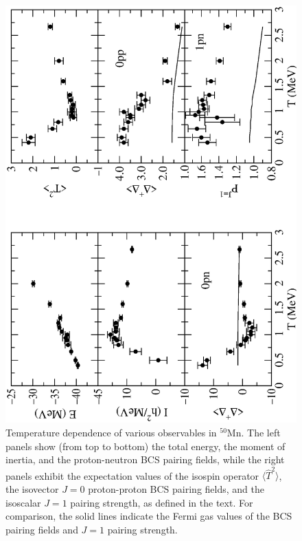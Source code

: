 \documentclass[rmp,aps,floatfix]{revtex4}
\begin{document}
\begin{figure}
\includegraphics[scale=0.5,angle=270]{dean_hjorthjensen_fig22.ps}
\caption{Temperature dependence of various observables in $^{50}$Mn.
The left panels show (from top to bottom) the total energy,
the moment of inertia, and the proton-neutron BCS pairing fields,
while the right panels exhibit
the expectation values of the isospin operator
$\langle \hat T^2 \rangle$, the isovector $J=0$ proton-proton 
BCS pairing fields, and the isoscalar $J=1$ pairing
strength, as defined in the text. For comparison,
the solid lines indicate the
Fermi gas values of the BCS pairing fields and $J=1$ pairing strength.
}
\label{fig_812}
\end{figure}
\end{document}
